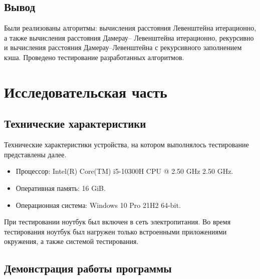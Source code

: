\documentclass[a4paper,14pt, unknownkeysallowed]{bmstu}
\begin{document}
\section{Вывод}

Были реализованы алгоритмы: вычисления расстояния Левенштейна
итерационно, а также вычисления расстояния Дамерау–
Левенштейна итерационно, рекурсивно и вычисления расстояния Дамерау–Левенштейна с рекурсивного заполнением кэша. Проведено тестирование разработанных алгоритмов.

\chapter{Исследовательская часть}

\section{Технические характеристики}

Технические характеристики устройства, на котором выполнялось тестирование представлены далее.

\begin{itemize}
	\item Процессор: Intel(R) Core(TM) i5-10300H CPU @ 2.50 GHz 2.50 GHz.
	\item Оперативная память: 16 GiB.
	\item Операционная система: Windows 10 Pro 21H2 64-bit.
\end{itemize}

При тестировании ноутбук был включен в сеть электропитания. Во время тестирования ноутбук был нагружен только встроенными приложениями
окружения, а также системой тестирования.

\section{Демонстрация работы программы}
\end{document}
